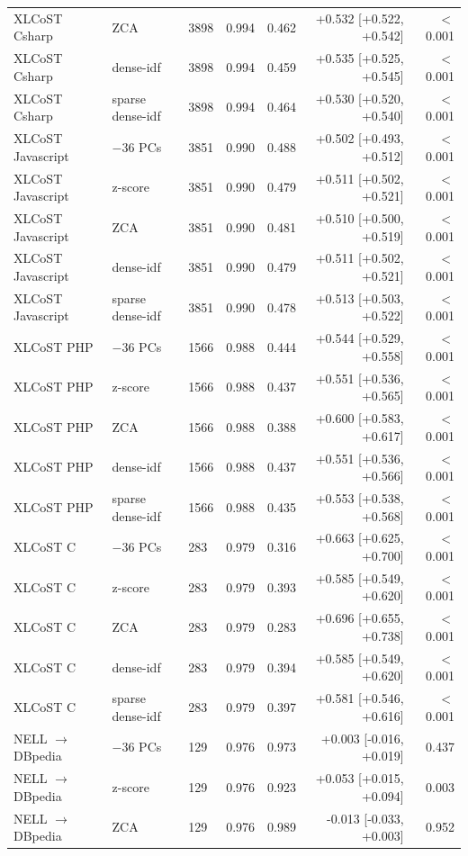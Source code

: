 \begin{longtable}{@{}lllrrrr@{}}
XLCoST Csharp & ZCA & 3898 & 0.994 & 0.462 & +0.532 [+0.522, +0.542] & $<$0.001 \\
XLCoST Csharp & dense-idf & 3898 & 0.994 & 0.459 & +0.535 [+0.525, +0.545] & $<$0.001 \\
XLCoST Csharp & sparse dense-idf & 3898 & 0.994 & 0.464 & +0.530 [+0.520, +0.540] & $<$0.001 \\
XLCoST Javascript & $-$36 PCs & 3851 & 0.990 & 0.488 & +0.502 [+0.493, +0.512] & $<$0.001 \\
XLCoST Javascript & z-score & 3851 & 0.990 & 0.479 & +0.511 [+0.502, +0.521] & $<$0.001 \\
XLCoST Javascript & ZCA & 3851 & 0.990 & 0.481 & +0.510 [+0.500, +0.519] & $<$0.001 \\
XLCoST Javascript & dense-idf & 3851 & 0.990 & 0.479 & +0.511 [+0.502, +0.521] & $<$0.001 \\
XLCoST Javascript & sparse dense-idf & 3851 & 0.990 & 0.478 & +0.513 [+0.503, +0.522] & $<$0.001 \\
XLCoST PHP & $-$36 PCs & 1566 & 0.988 & 0.444 & +0.544 [+0.529, +0.558] & $<$0.001 \\
XLCoST PHP & z-score & 1566 & 0.988 & 0.437 & +0.551 [+0.536, +0.565] & $<$0.001 \\
XLCoST PHP & ZCA & 1566 & 0.988 & 0.388 & +0.600 [+0.583, +0.617] & $<$0.001 \\
XLCoST PHP & dense-idf & 1566 & 0.988 & 0.437 & +0.551 [+0.536, +0.566] & $<$0.001 \\
XLCoST PHP & sparse dense-idf & 1566 & 0.988 & 0.435 & +0.553 [+0.538, +0.568] & $<$0.001 \\
XLCoST C & $-$36 PCs & 283 & 0.979 & 0.316 & +0.663 [+0.625, +0.700] & $<$0.001 \\
XLCoST C & z-score & 283 & 0.979 & 0.393 & +0.585 [+0.549, +0.620] & $<$0.001 \\
XLCoST C & ZCA & 283 & 0.979 & 0.283 & +0.696 [+0.655, +0.738] & $<$0.001 \\
XLCoST C & dense-idf & 283 & 0.979 & 0.394 & +0.585 [+0.549, +0.620] & $<$0.001 \\
XLCoST C & sparse dense-idf & 283 & 0.979 & 0.397 & +0.581 [+0.546, +0.616] & $<$0.001 \\
NELL $\to$ DBpedia & $-$36 PCs & 129 & 0.976 & 0.973 & +0.003 [-0.016, +0.019] & 0.437 \\
NELL $\to$ DBpedia & z-score & 129 & 0.976 & 0.923 & +0.053 [+0.015, +0.094] & 0.003 \\
NELL $\to$ DBpedia & ZCA & 129 & 0.976 & 0.989 & -0.013 [-0.033, +0.003] & 0.952 \\

\end{longtable}
